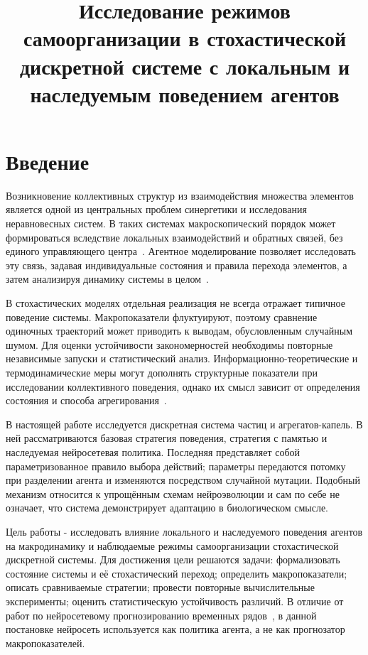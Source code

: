 \documentclass{misisarticle}
\title{Исследование режимов самоорганизации в стохастической дискретной системе с локальным и наследуемым поведением агентов}
\begin{document}
\maketitle

\section{Введение}

Возникновение коллективных структур из взаимодействия множества элементов является одной из центральных проблем синергетики и исследования неравновесных систем. В таких системах макроскопический порядок может формироваться вследствие локальных взаимодействий и обратных связей, без единого управляющего центра~\cite{haken,prigogine,nicolis}. Агентное моделирование позволяет исследовать эту связь, задавая индивидуальные состояния и правила перехода элементов, а затем анализируя динамику системы в целом~\cite{yangcarro}.

В стохастических моделях отдельная реализация не всегда отражает типичное поведение системы. Макропоказатели флуктуируют, поэтому сравнение одиночных траекторий может приводить к выводам, обусловленным случайным шумом. Для оценки устойчивости закономерностей необходимы повторные независимые запуски и статистический анализ. Информационно-теоретические и термодинамические меры могут дополнять структурные показатели при исследовании коллективного поведения, однако их смысл зависит от определения состояния и способа агрегирования~\cite{shannon,chen}.

В настоящей работе исследуется дискретная система частиц и агрегатов-капель. В ней рассматриваются базовая стратегия поведения, стратегия с памятью и наследуемая нейросетевая политика. Последняя представляет собой параметризованное правило выбора действий; параметры передаются потомку при разделении агента и изменяются посредством случайной мутации. Подобный механизм относится к упрощённым схемам нейроэволюции и сам по себе не означает, что система демонстрирует адаптацию в биологическом смысле.

Цель работы - исследовать влияние локального и наследуемого поведения агентов на макродинамику и наблюдаемые режимы самоорганизации стохастической дискретной системы. Для достижения цели решаются задачи: формализовать состояние системы и её стохастический переход; определить макропоказатели; описать сравниваемые стратегии; провести повторные вычислительные эксперименты; оценить статистическую устойчивость различий. В отличие от работ по нейросетевому прогнозированию временных рядов~\cite{lim,meng}, в данной постановке нейросеть используется как политика агента, а не как прогнозатор макропоказателей.
\end{document}
